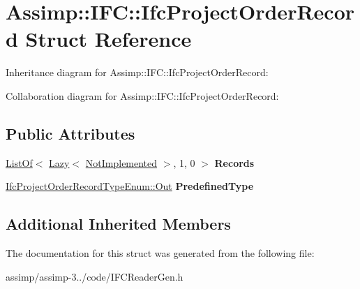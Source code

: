 \hypertarget{struct_assimp_1_1_i_f_c_1_1_ifc_project_order_record}{\section{Assimp\+:\+:I\+F\+C\+:\+:Ifc\+Project\+Order\+Record Struct Reference}
\label{struct_assimp_1_1_i_f_c_1_1_ifc_project_order_record}
}


Inheritance diagram for Assimp\+:\+:I\+F\+C\+:\+:Ifc\+Project\+Order\+Record\+:


Collaboration diagram for Assimp\+:\+:I\+F\+C\+:\+:Ifc\+Project\+Order\+Record\+:
\subsection*{Public Attributes}
\begin{DoxyCompactItemize}
\item 
\hypertarget{struct_assimp_1_1_i_f_c_1_1_ifc_project_order_record_a2eaa074321ddd76409589d5b28731943}{\hyperlink{struct_assimp_1_1_s_t_e_p_1_1_list_of}{List\+Of}$<$ \hyperlink{struct_assimp_1_1_s_t_e_p_1_1_lazy}{Lazy}$<$ \hyperlink{struct_assimp_1_1_i_f_c_1_1_not_implemented}{Not\+Implemented} $>$, 1, 0 $>$ {\bfseries Records}}\label{struct_assimp_1_1_i_f_c_1_1_ifc_project_order_record_a2eaa074321ddd76409589d5b28731943}

\item 
\hypertarget{struct_assimp_1_1_i_f_c_1_1_ifc_project_order_record_ab496b1e137b59e092a69ee8541aecdc1}{\hyperlink{classboost_1_1shared__ptr}{Ifc\+Project\+Order\+Record\+Type\+Enum\+::\+Out} {\bfseries Predefined\+Type}}\label{struct_assimp_1_1_i_f_c_1_1_ifc_project_order_record_ab496b1e137b59e092a69ee8541aecdc1}

\end{DoxyCompactItemize}
\subsection*{Additional Inherited Members}


The documentation for this struct was generated from the following file\+:\begin{DoxyCompactItemize}
\item 
assimp/assimp-\/3../code/I\+F\+C\+Reader\+Gen.\+h\end{DoxyCompactItemize}
